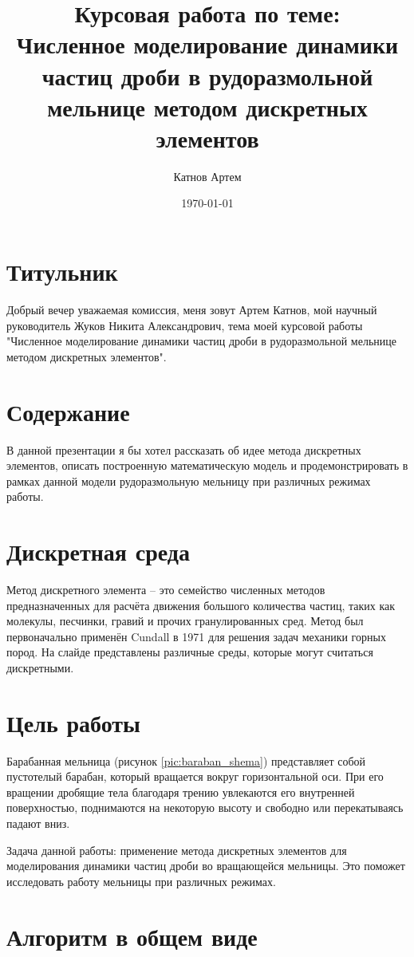 \documentclass[a4paper]{article}
\author{Катнов Артем}
\title{Курсовая работа по теме: \\ Численное моделирование динамики частиц дроби в рудоразмольной мельнице методом дискретных элементов}
\date{\today}
\begin{document}
\section{Титульник}

Добрый вечер уважаемая комиссия, меня зовут Артем Катнов, мой научный руководитель Жуков Никита Александрович, тема моей курсовой работы "Численное моделирование динамики частиц дроби в рудоразмольной мельнице методом дискретных элементов".

\section{Содержание}

В данной презентации я бы хотел рассказать об идее метода дискретных элементов, описать построенную математическую модель и продемонстрировать в рамках данной модели рудоразмольную мельницу при различных режимах работы.

\section{Дискретная среда}

Метод дискретного элемента -- это семейство численных методов предназначенных для расчёта движения большого количества частиц, таких как молекулы, песчинки, гравий и прочих гранулированных сред.
Метод был первоначально применён Cundall в 1971 для решения задач механики горных пород.
На слайде представлены различные среды, которые могут считаться дискретными.

\section{Цель работы}

Барабанная мельница (рисунок \ref{pic:baraban_shema}) представляет собой пустотелый барабан, который вращается вокруг горизонтальной оси.
При его вращении дробящие тела  благодаря трению увлекаются его внутренней поверхностью, поднимаются на некоторую высоту и свободно или перекатываясь падают вниз.

Задача данной работы: применение метода дискретных элементов для моделирования динамики частиц дроби во вращающейся мельницы. 
Это поможет исследовать работу мельницы при различных режимах.

\section{Алгоритм в общем виде}
\end{document}
